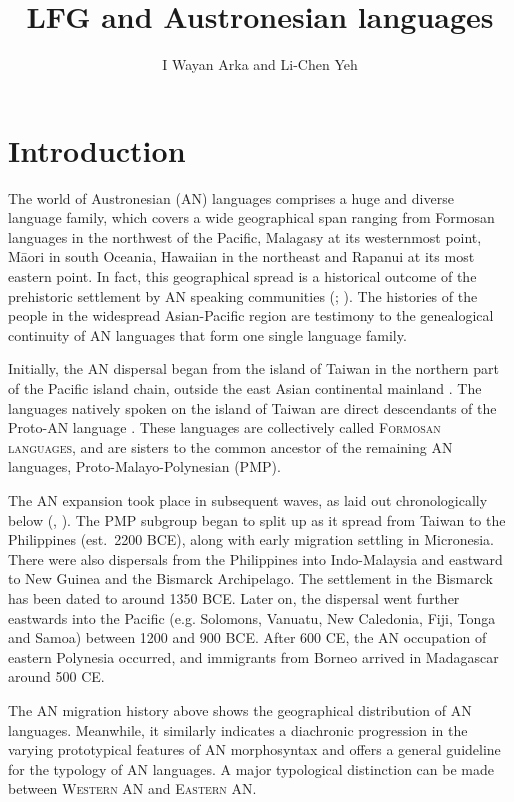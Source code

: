 \documentclass[output=paper,chinesefont]{../langscibook}
\title{LFG and Austronesian languages}
\author{I Wayan Arka\affiliation{The Australian National University} and Li-Chen Yeh\affiliation{The Australian National University}}
\begin{document}
\maketitle
\label{chap:Austronesian}

\section{Introduction}
\label{sec:Austronesian:1}

The world of Austronesian (AN) languages comprises a huge and diverse language family, which covers a wide geographical span ranging from Formosan languages in the northwest of the Pacific, Malagasy at its westernmost point, Māori in south Oceania, Hawaiian in the northeast and Rapanui at its most eastern point. In fact, this geographical spread is a historical outcome of the prehistoric settlement by AN speaking communities (\citealt{Pawley1998}; \citealt[242]{Bellwood2007}). The histories of the people in the widespread Asian-Pacific region are testimony to the genealogical continuity of AN languages that form one single language family.

Initially, the AN dispersal began from the island of Taiwan in the northern part of the Pacific island chain, outside the east Asian continental mainland \citep{Pawley2002,Bellwood2007,Skoglund2016,Blust2019}. The languages natively spoken on the island of Taiwan are direct descendants of the Proto-AN language \citep{Blust1999}. These languages are collectively called \textsc{Formosan languages}, and are sisters to the common ancestor of the remaining AN languages, Proto-Malayo-Polynesian (PMP).

The AN expansion took place in subsequent waves, as laid out chronologically below (\citealt{Adelaar1989}, \citealt[201-254]{Bellwood2007}). The PMP subgroup began to split up as it spread from Taiwan to the Philippines (est.~2200 BCE), along with early migration settling in Micronesia. There were also dispersals from the Philippines into Indo-Malaysia and eastward to New Guinea and the Bismarck Archipelago. The settlement in the Bismarck has been dated to around 1350 BCE. Later on, the dispersal went further eastwards into the Pacific (e.g. Solomons, Vanuatu, New Caledonia, Fiji, Tonga and Samoa) between 1200 and 900 BCE. After 600 CE, the AN occupation of eastern Polynesia occurred, and immigrants from Borneo arrived in Madagascar around 500 CE.

The AN migration history above shows the geographical distribution of AN languages. Meanwhile, it similarly indicates a diachronic progression in the varying prototypical features of AN morphosyntax and offers a general guideline for the typology of AN languages. A major typological distinction can be made between \textsc{Western AN} and \textsc{Eastern AN}.
\end{document}

